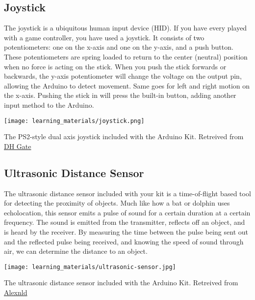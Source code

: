     \subsection*{Joystick}
    The joystick is a ubiquitous human input device (HID).
    If you have every played with a game controller, you have used a joystick.
    It consists of two potentiometers: one on the x-axis and one on the y-axis, and a push button.
    These potentiometers are spring loaded to return to the center (neutral) position when no force is acting on the stick.
    When you push the stick forwards or backwards, the y-axis potentiometer will change the voltage on the output pin, allowing the Arduino to detect movement.
    Same goes for left and right motion on the x-axis.
    Pushing the stick in will press the built-in button, adding another input method to the Arduino.

    \begin{marginfigure}[-2in]
        \texttt{[image: learning\_materials/joystick.png]}
        \caption[Joystick]{The PS2-style dual axis joystick included with the Arduino Kit. 
        Retreived from \href{https://www.orientdisplay.com/wp-content/uploads/2020/08/AMC1602AR-B-B6WTDW-I2C-1.jpg}
        {DH Gate}}
    \end{marginfigure}

    \subsection*{Ultrasonic Distance Sensor}
    The ultrasonic distance sensor included with your kit is a time-of-flight based tool for detecting the proximity of objects.
    Much like how a bat or dolphin uses echolocation, this sensor emits a pulse of sound for a certain duration at a certain frequency.
    The sound is emitted from the transmitter, reflects off an object, and is heard by the receiver.
    By measuring the time between the pulse being sent out and the reflected pulse being received, and knowing the speed of sound through air, we can determine the distance to an object.
    
    \begin{marginfigure}[-1.5in]
        \texttt{[image: learning\_materials/ultrasonic-sensor.jpg]}
        \caption[Ultrasonic Sensor]{The ultrasonic distance sensor included with the Arduino Kit. 
        Retreived from \href{https://alexnld.com/wp-content/uploads/2017/12/DIY4002_1.jpg}
        {Alexnld}}
    \end{marginfigure}

